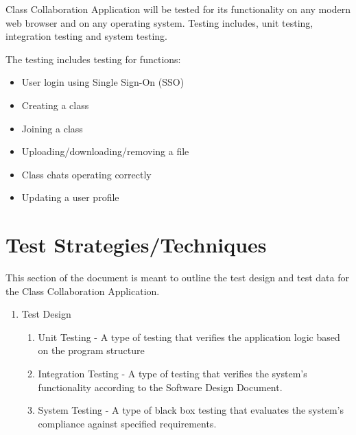 \documentclass{scrreprt}
\begin{document}
Class Collaboration Application will be tested for its functionality on any modern 	web browser and on any operating system. Testing includes, unit testing, integration testing and system testing.
 

The testing includes testing for functions:
\begin{itemize}
\item User login using Single Sign-On (SSO)
\item Creating a class
\item Joining a class
\item Uploading/downloading/removing a file
\item Class chats operating correctly
\item Updating a user profile
\end{itemize}

\chapter{Test Strategies/Techniques}
This section of the document is meant to outline the test design and test data for the Class Collaboration Application. 

\begin{enumerate}
\item Test Design
\begin{enumerate}
\item Unit Testing - A type of testing that verifies the application logic based on the program structure
\item Integration Testing - A type of testing that verifies the system’s functionality according to the Software Design Document.
\item System Testing - A type of black box testing that evaluates the system’s compliance against specified requirements.
\end{enumerate}
\end{enumerate}
\end{document}
